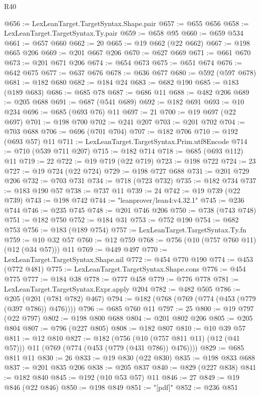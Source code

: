 \begin{lexlean}{R40}
\begin{coremodule}
@656 := LexLeanTarget.TargetSyntax.Shape.pair
@657 := @655 @656
@658 := LexLeanTarget.TargetSyntax.Ty.pair
@659 := @658 @95
@660 := @659 @534
@661 := @657 @660
@662 := 20
@665 := @19 @662 (@22 @662)
@667 := @198 @665 @206
@669 := @201 @667 @206
@670 := @627 @669
@671 := @661 @670
@673 := @201 @671 @206
@674 := @654 @673
@675 := @651 @674
@676 := @642 @675
@677 := @637 @676
@678 := @636 @677
@680 := @592 (@597 @678)
@681 := @182 @680
@682 := @184 @24
@683 := @682 @190
@685 := @183 (@189 @683)
@686 := @685 @78
@687 := @686 @11
@688 := @482 @206
@689 := @205 @688
@691 := @687 (@541 @689)
@692 := @182 @691
@693 := @10 @234
@696 := @685 (@693 @76) @11
@697 := 21
@700 := @19 @697 (@22 @697)
@701 := @198 @700
@702 := @241 @207
@703 := @201 @702
@704 := @703 @688
@706 := @696 (@701 @704)
@707 := @182 @706
@710 := @192 (@693 @57) @11
@711 := LexLeanTarget.TargetSyntax.Prim.utf8Encode
@714 := @710 (@539 @711 @207)
@715 := @182 @714
@718 := @685 (@693 @112) @11
@719 := 22
@722 := @19 @719 (@22 @719)
@723 := @198 @722
@724 := 23
@727 := @19 @724 (@22 @724)
@729 := @198 @727 @688
@731 := @201 @729 @206
@732 := @703 @731
@734 := @718 (@723 @732)
@735 := @182 @734
@737 := @183 @190 @57
@738 := @737 @11
@739 := 24
@742 := @19 @739 (@22 @739)
@743 := @198 @742
@744 := "leanprover/lean4:v4.32.1"
@745 := @236 @744
@746 := @235 @745
@748 := @201 @746 @206
@750 := @738 (@743 @748)
@751 := @182 @750
@752 := @184 @31
@753 := @752 @190
@754 := @682 @753
@756 := @183 (@189 @754)
@757 := LexLeanTarget.TargetSyntax.Ty.fn
@759 := @10 @32 @57
@760 := @12 @759
@768 := @756 (@10 (@757 @760 @11) (@12 (@34 @57))) @11
@769 := @449 @497
@770 := LexLeanTarget.TargetSyntax.Shape.nil
@772 := @454 @770 @190
@774 := @453 (@772 @481)
@775 := LexLeanTarget.TargetSyntax.Shape.cons
@776 := @454 @775
@777 := @184 @38
@778 := @777 @458
@779 := @776 @778
@781 := LexLeanTarget.TargetSyntax.Expr.apply @204
@782 := @482 @505
@786 := @205 (@201 (@781 @782) @467)
@794 := @182 (@768 (@769 (@774 (@453 (@779 (@397 @786)) @476))))
@796 := @685 @760 @11
@797 := 25
@800 := @19 @797 (@22 @797)
@802 := @198 @800 @688
@804 := @201 @802 @206
@805 := @205 @804
@807 := @796 (@227 @805)
@808 := @182 @807
@810 := @10 @39 @57
@811 := @12 @810
@827 := @182
    (@756 (@10 (@757 @811 @11) (@12 (@41 @57))) @11 (@769 (@774 (@453 (@779 (@431 @786)) @476))))
@829 := @685 @811 @11
@830 := 26
@833 := @19 @830 (@22 @830)
@835 := @198 @833 @688
@837 := @201 @835 @206
@838 := @205 @837
@840 := @829 (@227 @838)
@841 := @182 @840
@845 := @192 (@10 @53 @57) @11
@846 := 27
@849 := @19 @846 (@22 @846)
@850 := @198 @849
@851 := "[pdf]"
@852 := @236 @851

\end{coremodule}
\end{lexlean}
